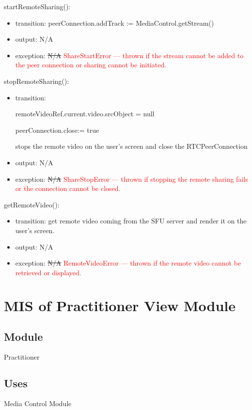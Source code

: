 \documentclass[12pt, titlepage]{article}
\newcommand{\rt}[1]{\textcolor{red}{#1}}
\begin{document}
\noindent startRemoteSharing():
\begin{itemize}
\item transition: peerConnection.addTrack := MediaControl.getStream()
\item output: N/A
\item exception: \sout{N/A} \rt{ShareStartError --- thrown if the stream cannot be added to the peer connection or sharing cannot be initiated.}
\end{itemize}

\noindent stopRemoteSharing():
\begin{itemize}
\item transition:

  remoteVideoRef.current.video.srcObject = null

  peerConnection.close:= true

  stops the remote video on the user’s screen and close the RTCPeerConnection
\item output: N/A
\item exception: \sout{N/A} \rt{ShareStopError --- thrown if stopping the remote sharing fails or the connection cannot be closed.}
\end{itemize}

\noindent getRemoteVideo():
\begin{itemize}
\item transition: get remote video coming from the SFU server and render it on the
  user's screen.
\item output: N/A
\item exception: \sout{N/A} \rt{RemoteVideoError --- thrown if the remote video cannot be retrieved or displayed.}
\end{itemize}


\section{MIS of Practitioner View Module} \label{sec:pracview}

\subsection{Module}

Practitioner

\subsection{Uses}

\noindent Media Control Module
\end{document}
